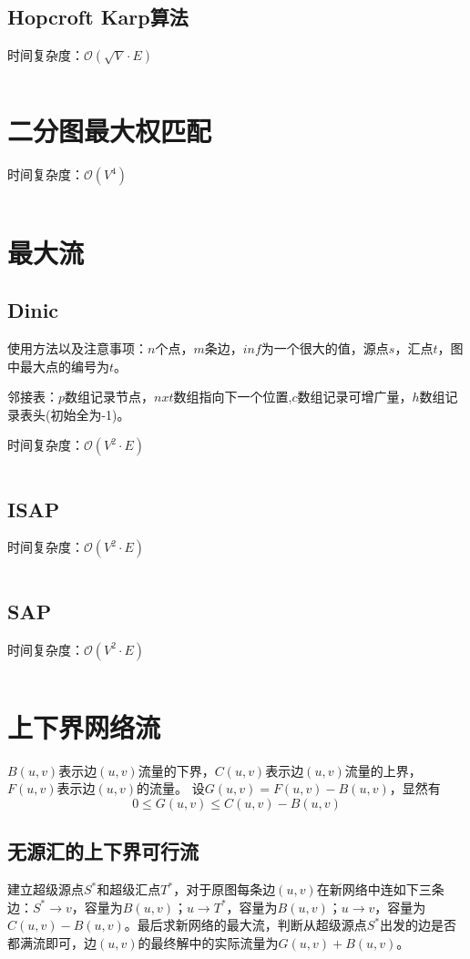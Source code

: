 \documentclass[a4paper,openany]{book}
\newcommand{\cppcode}[1]{
    \inputminted[mathescape,
    			 tabsize=4,
    			 linenos,
    			 frame=single,
    			 framesep=2mm,
    			 breakaftergroup=true,
    			 breakautoindent=true,
    			 breakbytoken=true,
    			 breaklines=true
    ]{cpp}{#1}
}
\begin{document}
\begin{spacing}{1.0}
			\subsection{Hopcroft Karp算法}
				时间复杂度：$\mathcal{O}(\sqrt{V} \cdot E)$
				\cppcode{Source/Graph-Theory/Maximum-Matching-Hopcroft-Karp.cpp}
		\section{二分图最大权匹配}
			时间复杂度：$\mathcal{O}(V^4)$
			\cppcode{Source/Graph-Theory/Maximum-Weight-Matching.cpp}
		\section{最大流}
			\subsection{Dinic}
				使用方法以及注意事项：$n$个点，$m$条边，$inf$为一个很大的值，源点$s$，汇点$t$，图中最大点的编号为$t$。\par
				\indent 邻接表：$p$数组记录节点，$nxt$数组指向下一个位置,$c$数组记录可增广量，$h$数组记录表头(初始全为-1)。\par
				\indent 时间复杂度：$\mathcal{O}(V^2 \cdot E)$
				\cppcode{Source/Graph-Theory/Maximum-Flow-Dinic.cpp}
			\subsection{ISAP}
				\indent 时间复杂度：$\mathcal{O}(V^2 \cdot E)$
				\cppcode{Source/Graph-Theory/Maximum-Flow-ISAP.cpp}
			\subsection{SAP}
				\indent 时间复杂度：$\mathcal{O}(V^2 \cdot E)$
				\cppcode{Source/Graph-Theory/Maximum-Flow-SAP.cpp}
		\section{上下界网络流}
			$B(u,v)$表示边$(u,v)$流量的下界，$C(u,v)$表示边$(u,v)$流量的上界，$F(u,v)$表示边$(u,v)$的流量。
			设$G(u,v) = F(u,v) - B(u,v)$，显然有
			$$0 \leq G(u,v) \leq C(u,v)-B(u,v)$$
		\subsection{无源汇的上下界可行流}
			建立超级源点$S^*$和超级汇点$T^*$，对于原图每条边$(u,v)$在新网络中连如下三条边：$S^* \rightarrow v$，容量为$B(u,v)$；$u \rightarrow T^*$，容量为$B(u,v)$；$u \rightarrow v$，容量为$C(u,v) - B(u,v)$。最后求新网络的最大流，判断从超级源点$S^*$出发的边是否都满流即可，边$(u,v)$的最终解中的实际流量为$G(u,v)+B(u,v)$。

\end{spacing}
\end{document}
